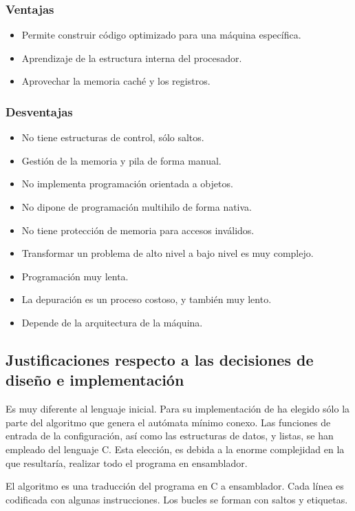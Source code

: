\documentclass[12pt,a4paper]{article}
\begin{document}
\subsubsection{Ventajas}
\begin{itemize}
\item Permite construir código optimizado para una máquina específica.
\item Aprendizaje de la estructura interna del procesador.
\item Aprovechar la memoria caché y los registros.
\end{itemize}

\subsubsection{Desventajas}
\begin{itemize}
\item No tiene estructuras de control, sólo saltos.
\item Gestión de la memoria y pila de forma manual.
\item No implementa programación orientada a objetos.
\item No dipone de programación multihilo de forma nativa.
\item No tiene protección de memoria para accesos inválidos.
\item Transformar un problema de alto nivel a bajo nivel es muy complejo.
\item Programación muy lenta.
\item La depuración es un proceso costoso, y también muy lento.
\item Depende de la arquitectura de la máquina.
\end{itemize}


\subsection{Justificaciones respecto a las decisiones de diseño e 
implementación}
Es muy diferente al lenguaje inicial. Para su implementación de ha elegido sólo 
la parte del algoritmo que genera el autómata mínimo conexo. Las funciones de 
entrada de la configuración, así como las estructuras de datos, y listas, se han 
empleado del lenguaje C. Esta elección, es debida a la enorme complejidad en la 
que resultaría, realizar todo el programa en ensamblador.

El algoritmo es una traducción del programa en C a ensamblador. Cada línea es 
codificada con algunas instrucciones. Los bucles se forman con saltos y 
etiquetas.
\end{document}
